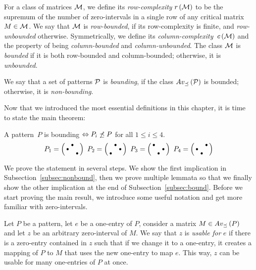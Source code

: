 \begin{defn}
For a class of matrices $\mathcal{M}$, we define its \emph{row-complexity} $r\left(\mathcal{M}\right)$ to be the supremum of the number of zero-intervals in a single row of any critical matrix~$M\in\mathcal{M}$. We say that $\mathcal{M}$ is \emph{row-bounded}, if its row-complexity is finite, and \emph{row-unbounded} otherwise. Symmetrically, we define its \emph{column-complexity}~$c\left(\mathcal{M}\right)$ and the property of being \emph{column-bounded} and \emph{column-unbounded}. The class $\mathcal{M}$ is \emph{bounded} if it is both row-bounded and column-bounded; otherwise, it is \emph{unbounded}.
\end{defn}

\begin{defn}
We say that a set of patterns $\mathcal{P}$ is \emph{bounding}, if the class $Av_{\preceq}\left(\mathcal{P}\right)$ is bounded; otherwise, it is \emph{non-bounding}.
\end{defn}

Now that we introduced the most essential definitions in this chapter, it is time to state the main theorem:

\begin{thm}
A pattern~$P$ is bounding $\Leftrightarrow P_i\not\preceq P$ for all $1\leq i\leq4$.
$$P_1=\left(\begin{smallmatrix} &\bullet& \\\bullet& & \\ & &\bullet\end{smallmatrix}\right)\ P_2=\left(\begin{smallmatrix} &\bullet& \\ & &\bullet\\\bullet& & \end{smallmatrix}\right)\ P_3=\left(\begin{smallmatrix}\bullet& & \\ & &\bullet\\ &\bullet& \end{smallmatrix}\right)\ P_4=\left(\begin{smallmatrix} & &\bullet\\\bullet& & \\ &\bullet& \end{smallmatrix}\right)$$
\end{thm}

We prove the statement in several steps. We show the first implication in Subsection~\ref{subsec:nonbound}, then we prove multiple lemmata so that we finally show the other implication at the end of Subsection~\ref{subsec:bound}. Before we start proving the main result, we introduce some useful notation and get more familiar with zero-intervals.

\begin{defn}
Let $P$ be a pattern, let $e$ be a one-entry of $P$, consider a matrix $M\in Av_{\preceq}\left(P\right)$ and let $z$ be an arbitrary zero-interval of $M$. We say that $z$ is \emph{usable for} $e$ if there is a zero-entry contained in $z$ such that if we change it to a one-entry, it creates a mapping of $P$ to $M$ that uses the new one-entry to map $e$. This way, $z$ can be usable for many one-entries of $P$ at once. 
\end{defn}

